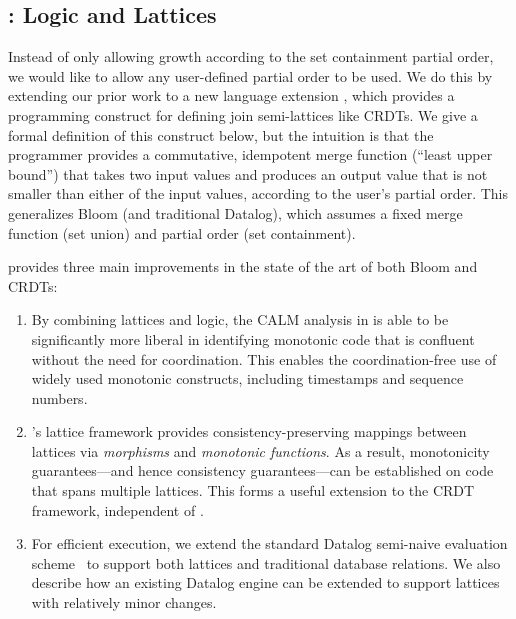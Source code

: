 
\subsection{\lang: Logic and Lattices}
Instead of only allowing growth according to the set containment
partial order, we would like to allow any user-defined partial order to be used.  
We do this by extending our prior work to a new language extension \lang, which provides a programming construct for defining join semi-lattices like CRDTs.
We give a
formal definition of this construct below, but the intuition is that the programmer provides a commutative, idempotent merge function (``least upper bound'')
that takes two input values and produces an output value that is not smaller
than either of the input values, according to the user's partial order. This
generalizes Bloom (and traditional Datalog), which assumes a fixed merge
function (set union) and partial order (set containment).

\lang provides three main improvements in the state of the art of both Bloom and CRDTs:  
\begin{enumerate}
\item By combining lattices and logic, the CALM analysis in \lang is able to be
  significantly more liberal in identifying monotonic code that is confluent
  without the need for coordination.  This enables the coordination-free use of
  widely used monotonic constructs, including timestamps and sequence numbers.
\item {\lang}'s lattice framework provides consistency-preserving mappings
  between lattices via \emph{morphisms} and \emph{monotonic functions}.  As a
  result, monotonicity guarantees---and hence consistency guarantees---can be
  established on code that spans multiple lattices.  This forms a useful
  extension to the CRDT framework, independent of \lang.
\item For efficient execution, we extend the standard Datalog semi-naive
  evaluation scheme~\cite{Balbin1987} to support both lattices and traditional
  database relations. We also describe how an existing Datalog engine can be
  extended to support lattices with relatively minor changes.
\end{enumerate}

